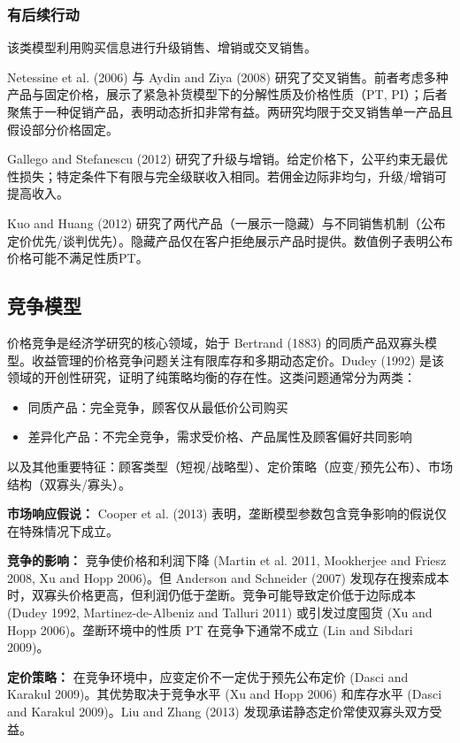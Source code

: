\subsubsection{有后续行动}\label{with-follow-up}

该类模型利用购买信息进行升级销售、增销或交叉销售。

Netessine et al. (2006) 与 Aydin and Ziya (2008) 研究了交叉销售。前者考虑多种产品与固定价格，展示了紧急补货模型下的分解性质及价格性质（PT, PI）；后者聚焦于一种促销产品，表明动态折扣非常有益。两研究均限于交叉销售单一产品且假设部分价格固定。

Gallego and Stefanescu (2012) 研究了升级与增销。给定价格下，公平约束无最优性损失；特定条件下有限与完全级联收入相同。若佣金边际非均匀，升级/增销可提高收入。

Kuo and Huang (2012) 研究了两代产品（一展示一隐藏）与不同销售机制（公布定价优先/谈判优先）。隐藏产品仅在客户拒绝展示产品时提供。数值例子表明公布价格可能不满足性质PT。

\subsection{竞争模型}\label{models-with-competition}

价格竞争是经济学研究的核心领域，始于 Bertrand (1883) 的同质产品双寡头模型。收益管理的价格竞争问题关注有限库存和多期动态定价。Dudey (1992) 是该领域的开创性研究，证明了纯策略均衡的存在性。这类问题通常分为两类：
\begin{itemize}
	\item 同质产品：完全竞争，顾客仅从最低价公司购买
	\item 差异化产品：不完全竞争，需求受价格、产品属性及顾客偏好共同影响
\end{itemize}

以及其他重要特征：顾客类型（短视/战略型）、定价策略（应变/预先公布）、市场结构（双寡头/寡头）。

\textbf{市场响应假说：} Cooper et al. (2013) 表明，垄断模型参数包含竞争影响的假说仅在特殊情况下成立。

\textbf{竞争的影响：} 竞争使价格和利润下降 (Martin et al. 2011, Mookherjee and Friesz 2008, Xu and Hopp 2006)。但 Anderson and Schneider (2007) 发现存在搜索成本时，双寡头价格更高，但利润仍低于垄断。竞争可能导致定价低于边际成本 (Dudey 1992, Martinez-de-Albeniz and Talluri 2011) 或引发过度囤货 (Xu and Hopp 2006)。垄断环境中的性质 PT 在竞争下通常不成立 (Lin and Sibdari 2009)。

\textbf{定价策略：} 在竞争环境中，应变定价不一定优于预先公布定价 (Dasci and Karakul 2009)。其优势取决于竞争水平 (Xu and Hopp 2006) 和库存水平 (Dasci and Karakul 2009)。Liu and Zhang (2013) 发现承诺静态定价常使双寡头双方受益。

